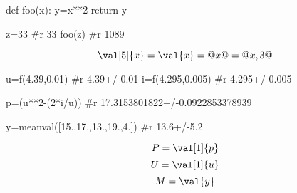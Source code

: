 \documentclass{article}
\begin{document}
\begin{calc}
def foo(x):
	y=x**2
	return y

z=33
#r 33
foo(z)
#r 1089
\end{calc}


$$
\val[5]{x} =
\val{x} =
@x@ =
@x,3@ $$

\begin{calc}
u=f(4.39,0.01)
#r 4.39+/-0.01
i=f(4.295,0.005)
#r 4.295+/-0.005

p=(u**2-(2*i/u))
#r 17.3153801822+/-0.0922853378939


y=meanval([15.,17.,13.,19.,4.])
#r 13.6+/-5.2
\end{calc}

$$ P=\val[1]{p} $$
$$ U=\val[1]{u} $$
$$ M = \val{y} $$
\end{document}
